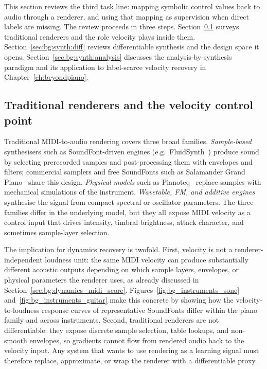 This section reviews the third task line: mapping symbolic control values back to audio through a renderer, and using that mapping as supervision when direct labels are missing. The review proceeds in three steps. Section~\ref{sec:bg:synth:traditional} surveys traditional renderers and the role velocity plays inside them. Section~\ref{sec:bg:synth:diff} reviews differentiable synthesis and the design space it opens. Section~\ref{sec:bg:synth:analysis} discusses the analysis-by-synthesis paradigm and its application to label-scarce velocity recovery in Chapter~\ref{ch:beyondpiano}.

\subsection{Traditional renderers and the velocity control point}
\label{sec:bg:synth:traditional}

Traditional MIDI-to-audio rendering covers three broad families. \emph{Sample-based} synthesisers such as SoundFont-driven engines (e.g.\ FluidSynth~\cite{fluidsynth}) produce sound by selecting prerecorded samples and post-processing them with envelopes and filters; commercial samplers and free SoundFonts such as Salamander Grand Piano~\cite{sf_salamander} share this design. \emph{Physical models} such as Pianoteq~\cite{pianoteq8} replace samples with mechanical simulations of the instrument. \emph{Wavetable, FM, and additive engines} synthesise the signal from compact spectral or oscillator parameters. The three families differ in the underlying model, but they all expose MIDI velocity as a control input that drives intensity, timbral brightness, attack character, and sometimes sample-layer selection.

The implication for dynamics recovery is twofold. First, velocity is not a renderer-independent loudness unit: the same MIDI velocity can produce substantially different acoustic outputs depending on which sample layers, envelopes, or physical parameters the renderer uses, as already discussed in Section~\ref{sec:bg:dynamics_midi_score}. Figures~\ref{fig:bg_instruments_sone} and~\ref{fig:bg_instruments_guitar} make this concrete by showing how the velocity-to-loudness response curves of representative SoundFonts differ within the piano family and across instruments. Second, traditional renderers are not differentiable: they expose discrete sample selection, table lookups, and non-smooth envelopes, so gradients cannot flow from rendered audio back to the velocity input. Any system that wants to use rendering as a learning signal must therefore replace, approximate, or wrap the renderer with a differentiable proxy.


